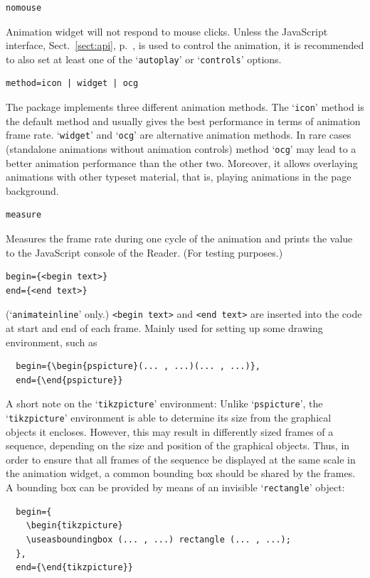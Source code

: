 \documentclass[a4paper]{article}
\begin{document}
\begin{verbatim}
nomouse
\end{verbatim}
Animation widget will not respond to mouse clicks. Unless the JavaScript interface, Sect.~\ref{sect:api}, p.~\pageref{sect:api}, is used to control the animation, it is recommended to also set at least one of the `\verb+autoplay+' or `\verb+controls+' options.
\begin{verbatim}
method=icon | widget | ocg
\end{verbatim}
The package implements three different animation methods. The `\verb+icon+' method is the default method and usually gives the best performance in terms of animation frame rate. `\verb+widget+' and `\verb+ocg+' are alternative animation methods. In rare cases (standalone animations without animation controls) method `\verb+ocg+' may lead to a better animation performance than the other two. Moreover, it allows overlaying animations with other typeset material, that is, playing animations in the page background.
\begin{verbatim}
measure
\end{verbatim}
Measures the frame rate during one cycle of the animation and prints the value to the JavaScript console of the Reader. (For testing purposes.)
\hypertarget{beginend}{}%
\begin{verbatim}
begin={<begin text>}
end={<end text>}
\end{verbatim}
(`\verb+animateinline+' only.) \verb+<begin text>+ and \verb+<end text>+ are inserted into the code at start and end of each frame. Mainly used for setting up some drawing environment, such as
\begin{verbatim}
  begin={\begin{pspicture}(... , ...)(... , ...)},
  end={\end{pspicture}}
\end{verbatim}
A short note on the `\verb+tikzpicture+' environment: Unlike `\verb+pspicture+', the `{\tt tikz\-pic\-ture}' environment is able to determine its size from the graphical objects it encloses. However, this may result in differently sized frames of a sequence, depending on the size and position of the graphical objects. Thus, in order to ensure that all frames of the sequence be displayed at the same scale in the animation widget, a common bounding box should be shared by the frames. A bounding box can be provided by means of an invisible `\verb+rectangle+' object:
\begin{verbatim}
  begin={
    \begin{tikzpicture}
    \useasboundingbox (... , ...) rectangle (... , ...);
  },
  end={\end{tikzpicture}}
\end{verbatim}
\end{document}
